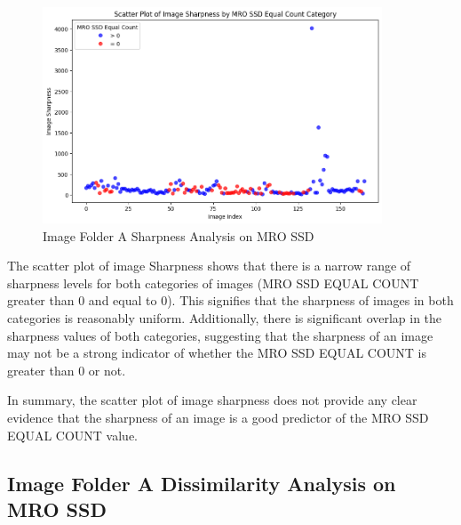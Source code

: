 \begin{figure}[ht]
    \centering
    \includegraphics[width=0.9\textwidth]{Figures/Results/sipa_02/sharpness.png}
    \caption[Image Folder A Sharpness Analysis on MRO SSD]{Image Folder A Sharpness Analysis on MRO SSD}
    \label{fig:Image Folder A Sharpness Analysis on MRO SSD}
\end{figure}



The scatter plot of image Sharpness shows that there is a narrow range of sharpness levels for both categories of images (MRO SSD EQUAL COUNT greater than 0 and equal to 0). This signifies that the sharpness of images in both categories is reasonably uniform. Additionally, there is significant overlap in the sharpness values of both categories, suggesting that the sharpness of an image may not be a strong indicator of whether the MRO SSD EQUAL COUNT is greater than 0 or not.

In summary, the scatter plot of image sharpness does not provide any clear evidence that the sharpness of an image is a good predictor of the MRO SSD EQUAL COUNT value.

\newpage


\subsection{Image Folder A Dissimilarity Analysis on MRO SSD}


